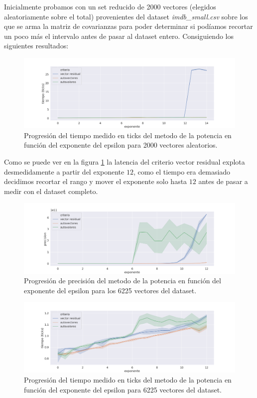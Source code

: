 Inicialmente probamos con un set reducido de 2000 vectores (elegidos aleatoriamente sobre el total) provenientes del dataset \textit{ imdb\_small.csv} sobre los que se arma la matriz de covarianzas para poder determinar si podíamos recortar un poco más el intervalo antes de pasar al dataset entero. Consiguiendo los siguientes resultados:

\begin{figure}[h]
\includegraphics[width=\textwidth]{./img/tiempo_2k.png}
\centering
\caption{Progresión del tiempo medido en ticks del metodo de la potencia en función del exponente del epsilon para 2000 vectores aleatorios.\label{fig:pm_2k_t}}
\end{figure}

Como se puede ver en la figura \ref{fig:pm_2k_t} la latencia del criterio vector residual explota desmedidamente a partir del exponente $12$, como el tiempo era demasiado decidimos recortar el rango y mover el exponente solo hasta $12$ antes de pasar a medir con el dataset completo.

\begin{figure}[h]
\includegraphics[width=\textwidth]{./img/precision_grande_full.png}
\centering
\caption{Progresión de precisión del metodo de la potencia en función del exponente del epsilon para los 6225 vectores del dataset.\label{fig:pm_g_p}}
\end{figure}

\begin{figure}[h]
\includegraphics[width=\textwidth]{./img/tiempo_grande_full.png}
\centering
\caption{Progresión del tiempo medido en ticks del metodo de la potencia en función del exponente del epsilon para 6225 vectores del dataset.\label{fig:pm_g_t}}
\end{figure}

